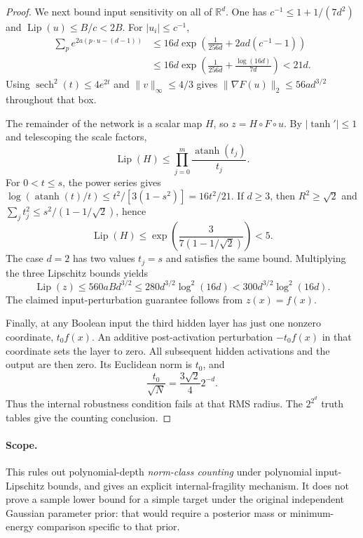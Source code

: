 \begin{proof}
We next bound input sensitivity on all of $\mathbb R^d$. One has
$c^{-1}\le1+1/(7d^2)$ and $\operatorname{Lip}(u)\le B/c<2B$.
For $|u_i|\le c^{-1}$,
\[
 \begin{split}
 \sum_p e^{2a(p\cdot u-(d-1))}
 &\le16d\exp\!\left(\frac1{256d}+2ad(c^{-1}-1)\right)\\
 &\le16d\exp\!\left(\frac1{256d}+\frac{\log(16d)}{7d}\right)<21d.
 \end{split}
\]
Using $\operatorname{sech}^2(t)\le4e^{2t}$ and $\|v\|_\infty\le4/3$ gives
$\|\nabla F(u)\|_2\le56ad^{3/2}$ throughout that box.

The remainder of the network is a scalar map $H$, so $z=H\circ F\circ u$.
By $|\tanh'|\le1$ and telescoping the scale factors,
\[
 \operatorname{Lip}(H)
 \le\prod_{j=0}^{m}\frac{\operatorname{atanh}(t_j)}{t_j}.
\]
For $0<t\le s$, the power series gives
$\log(\operatorname{atanh}(t)/t)\le t^2/[3(1-s^2)]=16t^2/21$.
If $d\ge3$, then $R^2\ge\sqrt2$ and
$\sum_jt_j^2\le s^2/(1-1/\sqrt2)$, hence
\[
 \operatorname{Lip}(H)
 \le\exp\!\left(\frac3{7(1-1/\sqrt2)}\right)<5.
\]
The case $d=2$ has two values $t_j=s$ and satisfies the same bound.
Multiplying the three Lipschitz bounds yields
\[
 \operatorname{Lip}(z)\le560aBd^{3/2}
 \le280d^{3/2}\log^2(16d)<300d^{3/2}\log^2(16d).
\]
The claimed input-perturbation guarantee follows from $z(x)=f(x)$.

Finally, at any Boolean input the third hidden layer has just one nonzero
coordinate, $t_0f(x)$. An additive post-activation perturbation
$-t_0f(x)$ in that coordinate sets the layer to zero. All subsequent hidden
activations and the output are then zero. Its Euclidean norm is $t_0$, and
\[
 \frac{t_0}{\sqrt N}=\frac{3\sqrt2}{4}2^{-d}.
\]
Thus the internal robustness condition fails at that RMS radius.
The $2^{2^d}$ truth tables give the counting conclusion.
\end{proof}

\paragraph{Scope.}
This rules out polynomial-depth \emph{norm-class counting} under polynomial
input-Lipschitz bounds, and gives an explicit internal-fragility mechanism.
It does not prove a sample lower bound for a simple target under the original
independent Gaussian parameter prior: that would require a posterior mass or
minimum-energy comparison specific to that prior.
